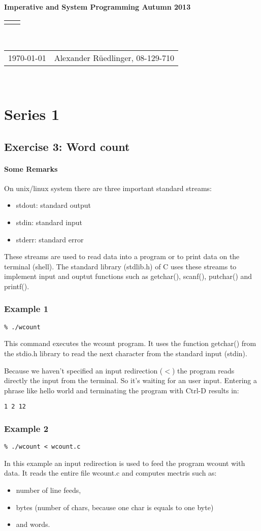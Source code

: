 \documentclass[12pt]{article}
\renewcommand{\title}[1]{\textbf{#1}\\}
\renewcommand{\line}{\begin{tabularx}{\textwidth}{X>{\raggedleft}X}\hline\\\end{tabularx}\\[-0.5cm]}
\newcommand{\leftright}[2]{\begin{tabularx}{\textwidth}{X>{\raggedleft}X}#1%
& #2\\\end{tabularx}\\[-1.5cm]}
\begin{document}
\title{Imperative and System Programming Autumn 2013}
\line
\leftright{\today}{Alexander Rüedlinger, 08-129-710} %
\section*{Series 1}
\subsection*{Exercise 3: Word count}
\paragraph{Some Remarks}
On unix/linux system there are three important standard streams:
\begin{itemize}
\item stdout: standard output
\item stdin: standard input
\item stderr: standard error
\end{itemize}

These streams are used to read data into a program or to print data on the terminal (shell). The standard library (stdlib.h) of C uses these streams to implement input and ouptut functions such as getchar(), scanf(), putchar() and printf().


\subsubsection*{Example 1}
\begin{lstlisting}
% ./wcount
\end{lstlisting}
This command executes the wcount program. It uses the function getchar() from the stdio.h library to read the next character from the standard input (stdin).  
   
Because we haven't specified an input redirection ($<$) the program reads directly the input from the terminal. So it's waiting for an user input.
Entering a phrase like hello world and terminating the program with Ctrl-D results in:
\begin{lstlisting}
1 2 12
\end{lstlisting}

\subsubsection*{Example 2}
\begin{lstlisting}
% ./wcount < wcount.c
\end{lstlisting}
In this example an input redirection is used to feed the program wcount with data.  
It reads the entire file wcount.c and computes mectris such as:
\begin{itemize}
	\item number of line feeds,
	\item bytes (number of chars, because one char is equals to one byte) 
	\item and words.
\end{itemize}
\end{document}
